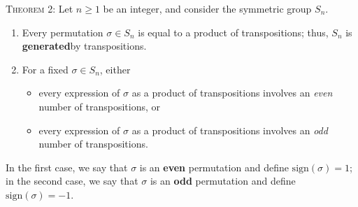 \documentclass[12pt]{amsart}
\begin{document}
\begin{framed}
\textsc{Theorem 2:} Let $n\geq 1$ be an integer, and consider the symmetric group $S_n$.
\begin{enumerate}
\item Every permutation $\sigma \in S_n$ is equal to a product of transpositions; thus, $S_n$ is \textbf{generated}\footnotemark by transpositions.
\item For a fixed $\sigma\in S_n$, either
\begin{itemize}
\item every expression of $\sigma$ as a product of transpositions involves an \textit{even} number of transpositions, or
\item every expression of $\sigma$ as a product of transpositions involves an \textit{odd} number of transpositions.
\end{itemize}
\end{enumerate}
In the first case, we say that $\sigma$ is an \textbf{even} permutation and define $\mathrm{sign}(\sigma) = 1$;
in the second case, we say that $\sigma$ is an \textbf{odd} permutation and define $\mathrm{sign}(\sigma) = -1$.
\end{framed}

\
\end{document}

